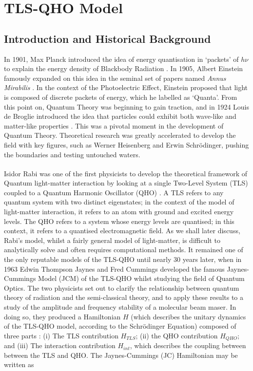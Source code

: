 \documentclass[12pt,a4paper]{article}
\begin{document}
\newpage

\section{TLS-QHO Model} \label{sec_TLS-QHO}

\subsection{Introduction and Historical Background}

In 1901, Max Planck introduced the idea of energy quantisation in `packets' of $h\nu$ to explain the energy density of Blackbody Radiation \cite{Context1901-Planck}. In 1905, Albert Einstein famously expanded on this idea in the seminal set of papers named \textit{Annus Mirabilis} \cite{Context1905-Einstein}. In the context of the Photoelectric Effect, Einstein proposed that light is composed of discrete packets of energy, which he labelled as `Quanta'. From this point on, Quantum Theory was beginning to gain traction, and in 1924 Louis de Broglie introduced the idea that particles could exhibit both wave-like and matter-like properties \cite{Context1924-DeBroglie}. This was a pivotal moment in the development of Quantum Theory. Theoretical research was greatly accelerated to develop the field with key figures, such as Werner Heisenberg and Erwin Schrödinger, pushing the boundaries and testing untouched waters. \\
\\
Isidor Rabi was one of the first physicists to develop the theoretical framework of Quantum light-matter interaction by looking at a single Two-Level System (TLS) coupled to a Quantum Harmonic Oscillator (QHO) \cite{Context1936-Rabi}. A TLS refers to any quantum system with two distinct eigenstates; in the context of the model of light-matter interaction, it refers to an atom with ground and excited energy levels. The QHO refers to a system whose energy levels are quantised; in this context, it refers to a quantised electromagnetic field. As we shall later discuss, Rabi's model, whilst a fairly general model of light-matter, is difficult to analytically solve and often requires computational methods. It remained one of the only reputable models of the TLS-QHO until nearly 30 years later, when in 1963 Edwin Thompson Jaynes and Fred Cummings developed the famous Jaynes-Cummings Model (JCM) of the TLS-QHO \cite{Context1963-JC_Original} whilst studying the field of Quantum Optics.
The two physicists set out to clarify the relationship between quantum theory of radiation and the semi-classical theory, and to apply these results to a study of the amplitude and frequency stability of a molecular beam maser. In doing so, they produced a Hamiltonian $H$ (which describes the unitary dynamics of the TLS-QHO model, according to the Schrödinger Equation) composed of three parts \cite{Hamiltonian2012-JC_Friction}: (i) The TLS contribution $H_{TLS}$; (ii) the QHO  contribution $H_{QHO}$; and (iii) The interaction contribution $H_{int}$, which describes the coupling between between the TLS and QHO. The Jaynes-Cummings (JC) Hamiltonian may be written as
\end{document}
